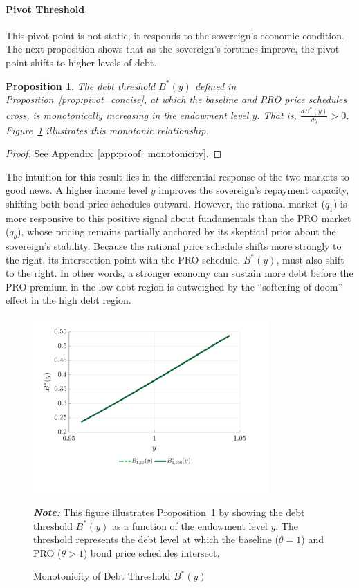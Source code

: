 \documentclass[12pt]{article}
\theoremstyle{plain}
\newtheorem{proposition}{Proposition}
\begin{document}
\paragraph{Pivot Threshold}This pivot point is not static; it responds to the sovereign's economic
condition. The next proposition shows that as the sovereign's fortunes improve,
the pivot point shifts to higher levels of debt.

\begin{proposition}
	\label{prop:monotonicity}
	The debt threshold $B^*(y)$ defined in Proposition~\ref{prop:pivot_concise}, at which the baseline and PRO price schedules cross, is monotonically increasing in the endowment level $y$. That is, $\frac{dB^*(y)}{dy} > 0$. Figure~\ref{fig:monotonicity} illustrates this monotonic relationship.
\end{proposition}

\begin{proof}
	See Appendix~\ref{app:proof_monotonicity}.
\end{proof}
The intuition for this result lies in the differential response of the two markets to good news. A higher income level $y$ improves the sovereign's repayment capacity, shifting both bond price schedules outward. However, the rational market ($q_1$) is more responsive to this positive signal about fundamentals than the PRO market ($q_\theta$), whose pricing remains partially anchored by its skeptical prior about the sovereign's stability. Because the rational price schedule shifts more strongly to the right, its intersection point with the PRO schedule, $B^*(y)$, must also shift to the right. In other words, a stronger economy can sustain more debt before the PRO premium in the low debt region is outweighed by the ``softening of doom'' effect in the high debt region.

\begin{figure}[htb]
	\centering
	\includegraphics[width=0.8\textwidth]{../../pro-default-model/results/comparison_figure_10.pdf}
	\caption{Monotonicity of Debt Threshold $B^*(y)$}
	\label{fig:monotonicity}
	\parbox{\textwidth}{\small\textit{\textbf{Note:} }This figure illustrates Proposition~\ref{prop:monotonicity} by showing the debt threshold $B^*(y)$ as a function of the endowment level $y$. The threshold represents the debt level at which the baseline ($\theta=1$) and PRO ($\theta>1$) bond price schedules intersect.}
\end{figure}
\end{document}
